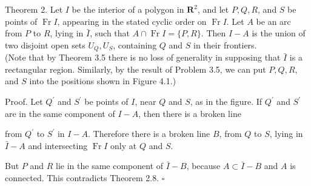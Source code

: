 Theorem 2. Let $I$ be the interior of a polygon in $\mathbf{R}^{2}$, and let $P, Q, R$, and $S$ be points of $\operatorname{Fr} I$, appearing in the stated cyclic order on $\operatorname{Fr} I$. Let $A$ be an arc from $P$ to $R$, lying in $\bar{I}$, such that $A \cap \operatorname{Fr} I=\{P, R\}$. Then $I-A$ is the union of two disjoint open sets $U_{Q}, U_{S}$, containing $Q$ and $S$ in their frontiers.\\
(Note that by Theorem 3.5 there is no loss of generality in supposing that $\bar{I}$ is a rectangular region. Similarly, by the result of Problem 3.5, we can put $P, Q, R$, and $S$ into the positions shown in Figure 4.1.)

Proof. Let $Q^{\prime}$ and $S^{\prime}$ be points of $I$, near $Q$ and $S$, as in the figure. If $Q^{\prime}$ and $S^{\prime}$ are in the same component of $I-A$, then there is a broken line

\begin{center}
\end{center}


from $Q^{\prime}$ to $S^{\prime}$ in $I-A$. Therefore there is a broken line $B$, from $Q$ to $S$, lying in $\bar{I}-A$ and intersecting $\operatorname{Fr} I$ only at $Q$ and $S$.

But $P$ and $R$ lie in the same component of $\bar{I}-B$, because $A \subset \bar{I}-B$ and $A$ is connected. This contradicts Theorem 2.8. \(\square\)
